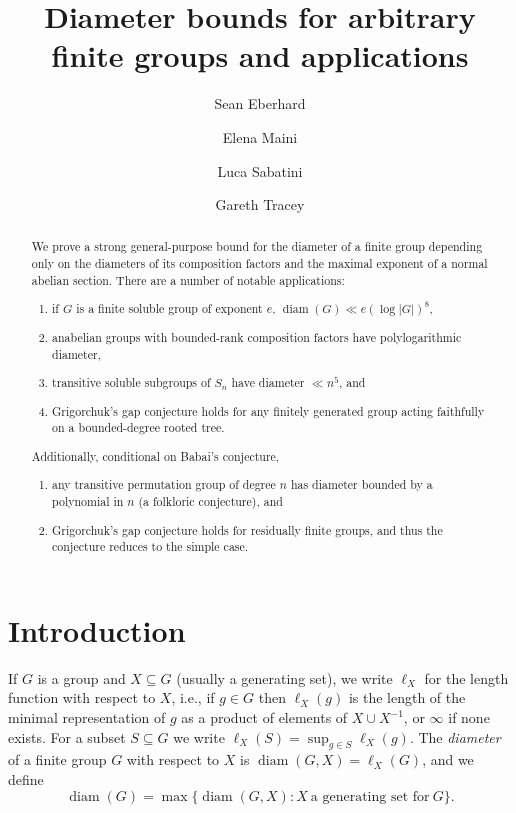 \documentclass[11pt,reqno]{amsart}
\author{Sean Eberhard}
\author{Elena Maini}
\author{Luca Sabatini}
\author{Gareth Tracey}
\numberwithin{equation}{section}
\theoremstyle{definition}
\theoremstyle{remark}
\newcommand\opr[1]{\operatorname{#1}}
\def\diam{\opr{diam}}
\def\len{\ell}
\numberwithin{equation}{section}
\begin{document}
\title[Diameter bounds for arbitrary finite groups]{Diameter bounds for arbitrary finite groups and applications}


\begin{abstract}
    We prove a strong general-purpose bound for the diameter of a finite group depending only on the diameters of its composition factors and the maximal exponent of a normal abelian section.
    There are a number of notable applications:
    \begin{enumerate}
        \item if $G$ is a finite soluble group of exponent $e$, $\diam(G) \ll e (\log |G|)^8$,
        \item anabelian groups with bounded-rank composition factors have polylogarithmic diameter,
        \item transitive soluble subgroups of $S_n$ have diameter $\ll n^5$, and
        \item Grigorchuk's gap conjecture holds for any finitely generated group acting faithfully on a bounded-degree rooted tree.
    \end{enumerate}
    Additionally, conditional on Babai's conjecture,
    \begin{enumerate}[resume]
        \item any transitive permutation group of degree $n$ has diameter bounded by a polynomial in $n$ (a folkloric conjecture), and
        \item Grigorchuk's gap conjecture holds for residually finite groups, and thus the conjecture reduces to the simple case.
    \end{enumerate}
\end{abstract}


\maketitle

\section{Introduction}
    If $G$ is a group and $X \subseteq G$ (usually a generating set), we write $\len_X$ for the length function with respect to $X$, i.e., if $g \in G$ then $\len_X(g)$ is the length of the minimal representation of $g$ as a product of elements of $X \cup X^{-1}$,
    or $\infty$ if none exists.
    For a subset $S \subseteq G$ we write $\len_X(S) = \sup_{g \in S} \len_X(g)$.
    The \emph{diameter} of a finite group $G$ with respect to $X$ is $\diam(G, X) = \len_X(G)$, and we define
    \[
        \diam(G) = \max \{\diam(G, X) : X~\text{a generating set for}~G\} .
    \]
\end{document}
